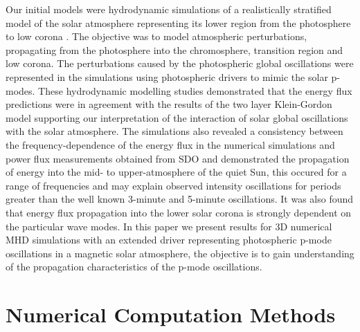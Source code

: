 \documentclass{aastex62}
\begin{document}
Our initial models were hydrodynamic simulations of a realistically stratified model of the solar atmosphere representing its lower region from the photosphere to low corona \citet{Griffiths2018}. The objective was to model atmospheric perturbations, propagating from the photosphere into the chromosphere, transition region and low corona. The perturbations caused by the photospheric global oscillations were represented in the simulations using photospheric drivers to mimic the solar p-modes. These hydrodynamic modelling studies demonstrated that the energy flux predictions were in agreement with the results of the two layer Klein-Gordon model supporting our interpretation of the interaction of solar global oscillations with the solar atmosphere. The simulations also revealed a consistency between the frequency-dependence of the energy flux in the numerical simulations and power flux measurements obtained from SDO and demonstrated the propagation of energy into the mid- to upper-atmosphere of the quiet Sun, this occured for a range of frequencies and may explain observed intensity oscillations for periods greater than the well known 3-minute and 5-minute oscillations. It was also found that energy flux propagation into the lower solar corona is strongly dependent on the particular wave modes.  In this paper we present results for 3D numerical MHD simulations with an extended driver representing photospheric p-mode oscillations in a magnetic solar atmosphere, the objective is to gain understanding of the propagation characteristics of the p-mode oscillations. 


\section{Numerical Computation Methods}
\end{document}
